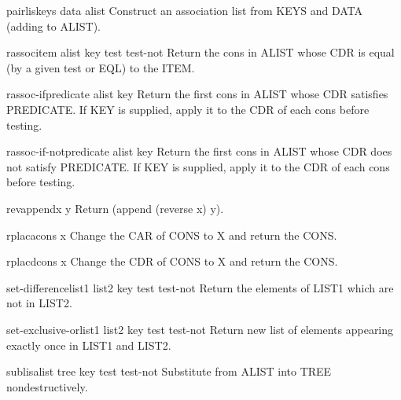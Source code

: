 \begin{function}{pairlis}{keys data \op alist}{}{}
  Construct an association list from KEYS and DATA (adding to ALIST).
\end{function}

\begin{function}{rassoc}{item alist \key key test test-not}{}{}
  Return the cons in ALIST whose CDR is equal (by a given test or EQL) to
   the ITEM.
\end{function}

\begin{function}{rassoc-if}{predicate alist \key key}{}{}
  Return the first cons in ALIST whose CDR satisfies PREDICATE. If KEY
  is supplied, apply it to the CDR of each cons before testing.
\end{function}

\begin{function}{rassoc-if-not}{predicate alist \key key}{}{}
  Return the first cons in ALIST whose CDR does not satisfy PREDICATE.
  If KEY is supplied, apply it to the CDR of each cons before testing.
\end{function}

\begin{function}{revappend}{x y}{}{}
  Return (append (reverse x) y).
\end{function}

\begin{function}{rplaca}{cons x}{}{}
  Change the CAR of CONS to X and return the CONS.
\end{function}

\begin{function}{rplacd}{cons x}{}{}
  Change the CDR of CONS to X and return the CONS.
\end{function}

\begin{function}{set-difference}{list1 list2 \key key test test-not}{}{}
  Return the elements of LIST1 which are not in LIST2.
\end{function}

\begin{function}{set-exclusive-or}{list1 list2 \key key test test-not}{}{}
  Return new list of elements appearing exactly once in LIST1 and LIST2.
\end{function}

\begin{function}{sublis}{alist tree \key key test test-not}{}{}
  Substitute from ALIST into TREE nondestructively.
\end{function}

